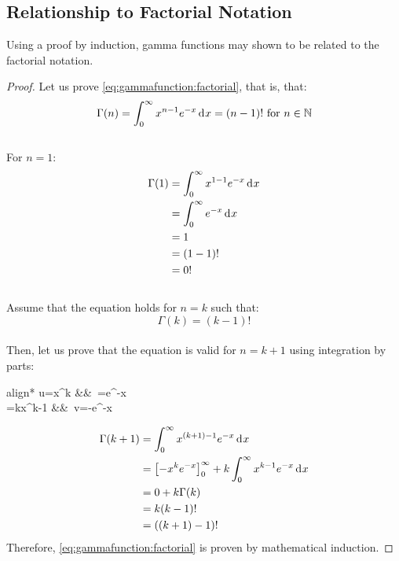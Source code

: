 \documentclass[12pt]{article}
\begin{document}

\pagebreak
\subsection{Relationship to Factorial Notation}
Using a proof by induction, gamma functions may shown to be related to the factorial notation.
\begin{proof}
	Let us prove \autoref{eq:gammafunction:factorial}, that is, that:\\[-12pt]
	\begin{equation*}
		\Gamma(n) = \int^\infty_0 x^{n-1}e^{-x}\mathop{}\!\mathrm{d^{}}x = (n-1)!\text{ for }n\in\mathbb{N}
	\end{equation*}\\[-24pt]
	For $n=1$:\\[-12pt]
	\begin{equation*}
		\begin{split}
			\Gamma(1)	&=	\int^\infty_0 x^{1-1}e^{-x}\mathop{}\!\mathrm{d^{}}x\\
						&=	\int^\infty_0 e^{-x}\mathop{}\!\mathrm{d^{}}x\\
						&=	1\\
						&=	(1-1)!\\
						&=	0!
		\end{split}
	\end{equation*}\\[-24pt]
	Assume that the equation holds for $n=k$ such that:\\[-12pt]
	\begin{equation*}
		\Gamma(k) = (k-1)!
	\end{equation*}\\[-24pt]
	Then, let us prove that the equation is valid for $n=k+1$ using integration by parts:\\[-12pt]
	\begin{empheq}[box=\widefbox]{align*}
		u=x^{k}						&&\,	=e^{-x}\\
		=kx^{k-1}	&&\,	v=-e^{-x}
	\end{empheq}
	\begin{equation*}
		\begin{split}
			\Gamma(k+1)	&=	\int^\infty_0 x^{(k+1)-1}e^{-x}\mathop{}\!\mathrm{d^{}}x\\
						&=	\left[-x^k e^{-x}\right]^\infty_0 + k\int^\infty_0 x^{k-1}e^{-x}\mathop{}\!\mathrm{d^{}}x\\
						&=	0 +k\Gamma(k)\\
						&=	k(k-1)!\\
						&=	((k+1)-1)!
		\end{split}
	\end{equation*}
	Therefore, \autoref{eq:gammafunction:factorial} is proven by mathematical induction.
\end{proof}
\end{document}
